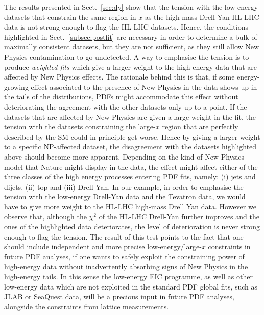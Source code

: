 \documentclass[withindex,glossary]{cam-thesis}
\begin{document}
The results presented in Sect.~\ref{sec:dy} show that the tension with the low-energy datasets that 
constrain the same region in $x$ as the high-mass Drell-Yan HL-LHC data is not strong enough to flag the 
HL-LHC datasets. Hence, the conditions highlighted in Sect.~\ref{subsec:postfit} are necessary in order to determine a bulk of maximally
consistent datasets, but they are not sufficient, as they still allow
New Physics contamination to go undetected. 
A way to emphasise the tension is to produce {\it weighted fits} which give a larger weight to the high-energy data that are affected by 
New Physics effects. The rationale behind this is that, if some energy-growing
effect associated to the presence of New Physics in the data shows up in the tails
of the distributions, PDFs might accommodate this effect without deteriorating the agreement with the other datasets 
only up to a point. If the datasets that are affected by New
Physics are given a large weight in the fit, the tension with the datasets constraining the large-$x$ region 
that are perfectly described by the SM could in principle get worse. Hence by giving a
larger weight to a specific NP-affected dataset, the disagreement with the datasets highlighted 
above should become more apparent. 
%
Depending on the kind of New Physics model that Nature might display in the data, 
the effect might affect either of the three
classes of the high energy processes entering PDF fits, namely: (i)
jets and dijets, (ii) top and (iii) Drell-Yan. In our example, in order to emphasise the tension with the 
low-energy Drell-Yan data and the Tevatron data, we would have to give more weight to the HL-LHC high-mass 
Drell Yan data. However we observe that, although the $\chi^2$ of the HL-LHC Drell-Yan further improves and the 
ones of the highlighted data deteriorates, the level of deterioration is never strong enough to flag the tension. 
The result of this test points to the fact that one should include independent and more precise 
low-energy/large-$x$ constraints in future PDF analyses, 
if one wants to safely exploit the constraining power of high-energy 
data without inadvertently absorbing signs of New Physics 
in the high-energy tails. In this sense the low-energy EIC programme, as well as 
other low-energy data which are not exploited in the standard PDF global fits, such 
as JLAB or SeaQuest data, will be a precious input in future PDF analyses, alongside the 
constraints from lattice measurements. 
\end{document}

